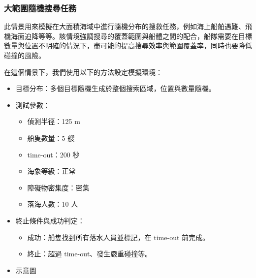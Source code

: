 \documentclass[12pt,a4paper]{article}
\begin{document}
\subsubsection{大範圍隨機搜尋任務}
此情景用來模擬在大面積海域中進行隨機分布的搜救任務，例如海上船舶遇難、飛機海面迫降等等。該情境強調搜尋的覆蓋範圍與船體之間的配合，船隊需要在目標數量與位置不明確的情況下，盡可能的提高搜尋效率與範圍覆蓋率，同時也要降低碰撞的風險。
\\ \par
在這個情景下，我們使用以下的方法設定模擬環境：
\begin{itemize}
    \item 目標分布：多個目標隨機生成於整個搜索區域，位置與數量隨機。
    \item 測試參數：
    \begin{itemize}
        \item 偵測半徑：125 m
        \item 船隻數量：5 艘
        \item time-out：200 秒
        \item 海象等級：正常
        \item 障礙物密集度：密集
        \item 落海人數：10 人
    \end{itemize}
    \item 終止條件與成功判定：
    \begin{itemize}
        \item 成功：船隻找到所有落水人員並標記，在 time-out 前完成。
        \item 終止：超過 time-out、發生嚴重碰撞等。
    \end{itemize}
    \item 示意圖
\end{itemize}
\end{document}
